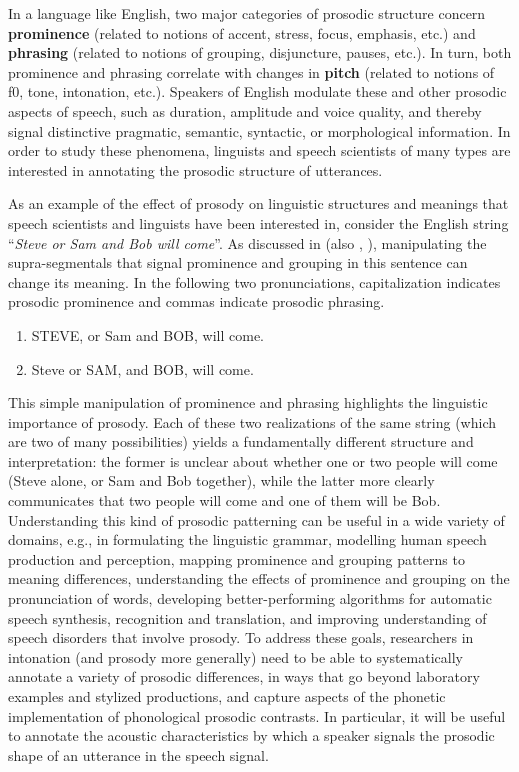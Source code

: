 \documentclass[11pt, twoside]{memoir}
\def\langtext#1{\textit{#1}}
\begin{document}
In a language like English, two major categories of prosodic structure concern \textbf{prominence} (related to notions of accent, stress, focus, emphasis, etc.) and \textbf{phrasing} (related to notions of grouping, disjuncture, pauses, etc.). In turn, both prominence and phrasing correlate with changes in \textbf{pitch} (related to notions of f0, tone, intonation, etc.). Speakers of English modulate these and other prosodic aspects of speech, such as duration, amplitude and voice quality, and thereby signal distinctive pragmatic, semantic, syntactic, or morphological information. In order to study these phenomena, linguists and speech scientists of many types are interested in annotating the prosodic structure of utterances.

As an example of the effect of prosody on linguistic structures and meanings that speech scientists and linguists have been interested in, consider the English string “\langtext{Steve or Sam and Bob will come}”. As discussed in \citealt{lehiste73} (also \citealt{price-91}, \citealt{veilleux-06}), manipulating the supra-segmentals that signal prominence and grouping in this sentence can change its meaning. In the following two pronunciations, capitalization indicates prosodic prominence and commas indicate prosodic phrasing.

\begin{enumerate} \def\labelenumi{\arabic{enumi}.}
\item STEVE, or Sam and BOB, will come.
\item Steve or SAM, and BOB, will come. \end{enumerate}

This simple manipulation of prominence and phrasing highlights the linguistic importance of prosody. Each of these two realizations of the same string (which are two of many possibilities) yields a fundamentally different structure and interpretation: the former is unclear about whether one or two people will come (Steve alone, or Sam and Bob together), while the latter more clearly communicates that two people will come and one of them will be Bob. Understanding this kind of prosodic patterning can be useful in a wide variety of domains, e.g., in formulating the linguistic grammar, modelling human speech production and perception, mapping prominence and grouping patterns to meaning differences, understanding the effects of prominence and grouping on the pronunciation of words, developing better-performing algorithms for automatic speech synthesis, recognition and translation, and improving understanding of speech disorders that involve prosody. To address these goals, researchers in intonation (and prosody more generally) need to be able to systematically annotate a variety of prosodic differences, in ways that go beyond laboratory examples and stylized productions, and capture aspects of the phonetic implementation of phonological prosodic contrasts. In particular, it will be useful to annotate the acoustic characteristics by which a speaker signals the prosodic shape of an utterance in the speech signal.
\end{document}

